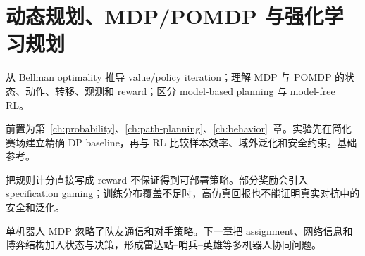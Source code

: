 \chapter{动态规划、MDP/POMDP 与强化学习规划}
\label{ch:dp-rl}

\begin{learningobjectives}
从 Bellman optimality 推导 value/policy iteration；理解 MDP 与 POMDP 的状态、动作、转移、观测和 reward；区分 model-based planning 与 model-free RL。
\end{learningobjectives}

\begin{prerequisites}
前置为第~\ref{ch:probability}、\ref{ch:path-planning}、\ref{ch:behavior}~章。实验先在简化赛场建立精确 DP baseline，再与 RL 比较样本效率、域外泛化和安全约束。基础参考\cite{sutton2018reinforcement,bertsekas2017dynamic}。
\end{prerequisites}


\begin{failuremode}
把规则计分直接写成 reward 不保证得到可部署策略。部分奖励会引入 specification gaming；训练分布覆盖不足时，高仿真回报也不能证明真实对抗中的安全和泛化。
\end{failuremode}

\begin{chaptertransition}
单机器人 MDP 忽略了队友通信和对手策略。下一章把 assignment、网络信息和博弈结构加入状态与决策，形成雷达站--哨兵--英雄等多机器人协同问题。
\end{chaptertransition}

